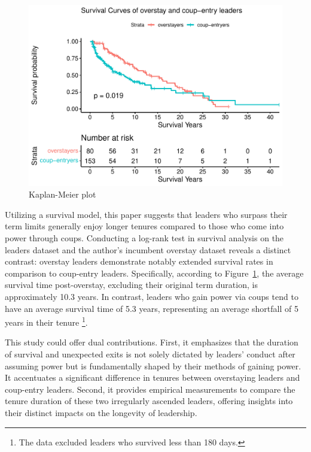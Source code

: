 \documentclass[
  12pt,
  a4paper,
  12pt]{article}
\begin{document}
\begin{figure}

{\centering \includegraphics{survival_after_coups_jasa_files/figure-pdf/fig-logrank-1.pdf}

}

\caption{\label{fig-logrank}Kaplan-Meier plot}

\end{figure}

Utilizing a survival model, this paper suggests that leaders who surpass
their term limits generally enjoy longer tenures compared to those who
come into power through coups. Conducting a log-rank test in survival
analysis on the leaders dataset \citep{goemans2009} and the author's
incumbent overstay dataset reveals a distinct contrast: overstay leaders
demonstrate notably extended survival rates in comparison to coup-entry
leaders. Specifically, according to Figure~\ref{fig-logrank}, the
average survival time post-overstay, excluding their original term
duration, is approximately 10.3 years. In contrast, leaders who gain
power via coups tend to have an average survival time of 5.3 years,
representing an average shortfall of 5 years in their tenure
\footnote{The data excluded leaders who survived less than 180 days.}.

This study could offer dual contributions. First, it emphasizes that the
duration of survival and unexpected exits is not solely dictated by
leaders' conduct after assuming power but is fundamentally shaped by
their methods of gaining power. It accentuates a significant difference
in tenures between overstaying leaders and coup-entry leaders. Second,
it provides empirical measurements to compare the tenure duration of
these two irregularly ascended leaders, offering insights into their
distinct impacts on the longevity of leadership.
\end{document}
